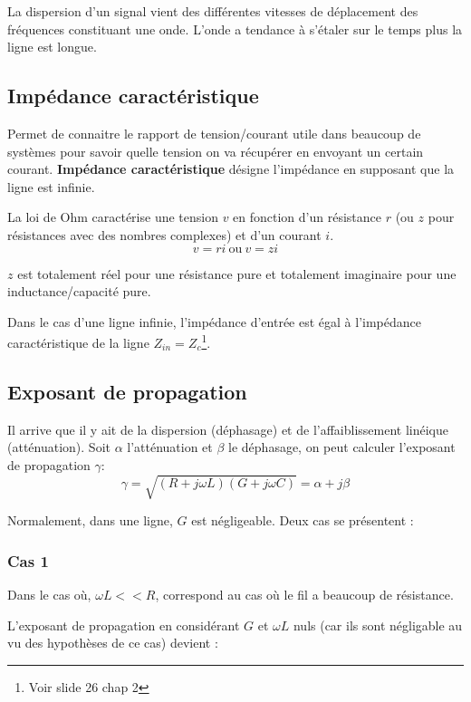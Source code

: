 		La dispersion d'un signal vient des différentes vitesses de déplacement des fréquences constituant une onde. L'onde a tendance à s'étaler sur le temps plus la ligne est longue.
		
	\subsection{Impédance caractéristique}
		Permet de connaitre le rapport de tension/courant utile dans beaucoup de systèmes pour savoir quelle tension on va récupérer en envoyant un certain courant. \textbf{Impédance caractéristique} désigne l'impédance en supposant que la ligne est infinie.
		
		La loi de Ohm caractérise une tension $v$ en fonction d'un résistance $r$ (ou $z$ pour résistances avec des nombres complexes) et d'un courant $i$.
		\begin{equation}
			v = ri\  \text{ou} \  v = zi
		\end{equation}
		
		$z$ est totalement réel pour une résistance pure et totalement imaginaire pour une inductance/capacité pure.
		
		Dans le cas d'une ligne infinie, l'impédance d'entrée est égal à l'impédance caractéristique de la ligne $Z_{in} = Z_c$\footnote{Voir slide 26 chap 2}.
		
	\subsection{Exposant de propagation}
		Il arrive que il y ait de la dispersion (déphasage) et de l'affaiblissement linéique (atténuation). Soit $\alpha$ l'atténuation et $\beta$ le déphasage, on peut calculer l'exposant de propagation $\gamma$:
		\begin{equation}
			\gamma = \sqrt{(R + j \omega L)(G + j \omega C)} = \alpha + j \beta
		\end{equation}
		
		Normalement, dans une ligne, $G$ est négligeable. Deux cas se présentent :
		
		\subsubsection{Cas 1}
			Dans le cas où, $\omega L << R$, correspond au cas où le fil a beaucoup de résistance.
			
			L'exposant de propagation en considérant $G$ et $\omega L$ nuls (car ils sont négligable au vu des hypothèses de ce cas) devient :
			
